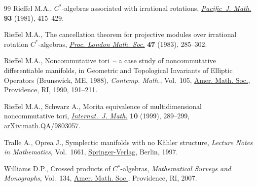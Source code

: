 \documentclass[11pt]{article}
\numberwithin{equation}{section}
\numberwithin{equation}{section}
\begin{document}
\begin{thebibliography}{99}
Rieffel M.A., {$C^{\ast} $}-algebras associated with irrational rotations,
 \href{https://doi.org/10.2140/pjm.1981.93.415}{\textit{Pacific~J. Math.}} \textbf{93} (1981), 415--429.

Rieffel M.A., The cancellation theorem for projective modules over irrational
 rotation {$C^{\ast} $}-algebras, \href{https://doi.org/10.1112/plms/s3-47.2.285}{\textit{Proc. London Math. Soc.}} \textbf{47}
 (1983), 285--302.

Rieffel M.A., Noncommutative tori~-- a case study of noncommutative
 differentiable manifolds, in Geometric and Topological Invariants of Elliptic
 Operators ({B}runswick, {ME}, 1988), \textit{Contemp. Math.}, Vol.~105, \href{https://doi.org/10.1090/conm/105/1047281}{Amer.
 Math. Soc.}, Providence, RI, 1990, 191--211.

Rieffel M.A., Schwarz A., Morita equivalence of multidimensional noncommutative
 tori, \href{https://doi.org/10.1142/S0129167X99000100}{\textit{Internat.~J. Math.}} \textbf{10} (1999), 289--299,
 \href{https://arxiv.org/abs/math.QA/9803057}{arXiv:math.QA/9803057}.

Tralle A., Oprea J., Symplectic manifolds with no {K}\"ahler structure,
 \textit{Lecture Notes in Mathematics}, Vol.~1661, \href{https://doi.org/10.1007/BFb0092608}{Springer-Verlag}, Berlin,
 1997.

Williams D.P., Crossed products of {$C{^\ast}$}-algebras, \textit{Mathematical
 Surveys and Monographs}, Vol.~134, \href{https://doi.org/10.1090/surv/134}{Amer. Math. Soc.}, Providence, RI, 2007.

\end{thebibliography}
\end{document}

